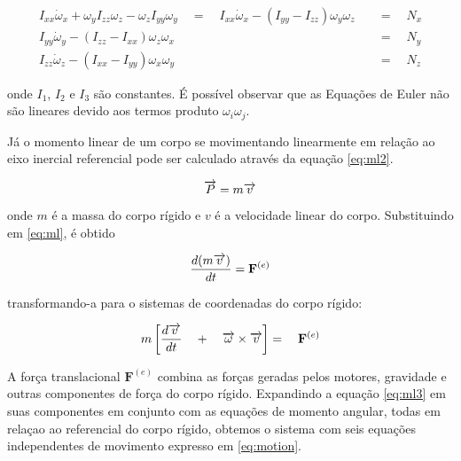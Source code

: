 \documentclass[a4paper, 12pt]{article}
\begin{document}
\begin{equation}
\begin{aligned}
{ I }_{ xx }{ \dot { \omega  }  }_{ x }+{ \omega  }_{ y }I_{ zz }\omega _{ z }-\omega _{ z }I_{ yy }\omega _{ y }\quad =\quad { I }_{ xx }{ \dot { \omega  }  }_{ x } - (I_{ yy } - I_{ zz }){ \omega  }_{ y }{ \omega  }_{ z }\quad &=\quad N_{ x } \\
{ I }_{ yy }{ \dot { \omega  }  }_{ y } - (I_{ zz } - I_{ xx }){ \omega  }_{ z }{ \omega  }_{ x }\quad &=\quad N_{ y }\\
{ I }_{ zz }{ \dot { \omega  }  }_{ z } - (I_{ xx } - I_{ yy }){ \omega  }_{ x }{ \omega  }_{ y }\quad &=\quad N_{ z }
\end{aligned}
\label{eq:eulers}
\end{equation}

\noindent onde $I_1$, $I_2$ e $I_3$ são constantes. É possível observar que as Equações de Euler não são lineares devido aos termos produto $\omega_i\omega_j$. 

Já o momento linear de um corpo se movimentando linearmente em relação ao eixo inercial referencial pode ser calculado através da equação \ref{eq:ml2}.

\begin{equation}
\centering
\overrightarrow { P } = m\overrightarrow { v } 
\label{eq:ml2}
\end{equation}

\noindent onde $m$ é a massa do corpo rígido e $v$ é a velocidade linear do corpo. Substituindo em \ref{eq:ml}, é obtido 

\begin{equation}
\centering
\frac { d(m\overrightarrow { v } ) }{ dt } ={ \mathbf{F} }^{ (e) }
\label{eq:ml3}
\end{equation}

\noindent  transformando-a para o sistemas de coordenadas do corpo rígido:

\begin{equation}
\centering
m\left[ \frac { d\overrightarrow { v }  }{ dt } \quad +\quad \overrightarrow { \omega  } \times \overrightarrow { v }  \right] =\quad { \mathbf{F} }^{ (e) }
\label{eq:ml3}
\end{equation}

\noindent A força translacional $\mathbf{F}^{(e)}$ combina as forças geradas pelos motores, gravidade e outras componentes de força do corpo rígido. Expandindo a equação \ref{eq:ml3} em suas componentes em conjunto com as equações de momento angular, todas em relaçao ao referencial do corpo rígido, obtemos o sistema com seis equações independentes de movimento expresso em \ref{eq:motion}.
\end{document}
